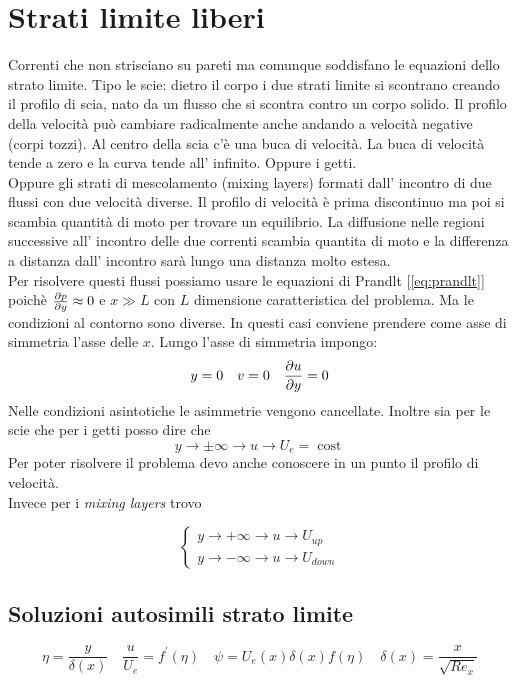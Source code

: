 \section{Strati limite liberi}
Correnti che non strisciano su pareti ma comunque soddisfano le equazioni dello strato limite. Tipo le scie: dietro il corpo i due strati limite si scontrano creando il profilo di scia, nato da un flusso che si scontra contro un corpo solido. Il profilo della velocità può cambiare radicalmente anche andando a velocità negative (corpi tozzi). Al centro della scia c'è una buca di velocità. La buca di velocità tende a zero e la curva tende all' infinito.
Oppure i getti.\\
Oppure gli strati di mescolamento (mixing layers) formati dall' incontro di due flussi con due velocità diverse. Il profilo di velocità è prima discontinuo ma poi si scambia quantità di moto per trovare un equilibrio. La diffusione nelle regioni successive all' incontro delle due correnti scambia quantita di moto e la differenza a distanza dall' incontro sarà lungo una distanza molto estesa.\\
Per risolvere questi flussi possiamo usare le equazioni di Prandlt [\cref{eq:prandlt}] poichè $ \frac{\partial p}{\partial y}\approx  0 $ e $ x\gg L $ con $ L  $ dimensione caratteristica del problema.   
Ma le condizioni al contorno sono diverse.
In questi casi conviene prendere come asse di simmetria l'asse delle $ x $.
Lungo l'asse di simmetria impongo: 
\[
  y = 0\quad v = 0 \quad \frac{\partial u}{\partial y}=0
\]
Nelle condizioni asintotiche le asimmetrie vengono cancellate.
Inoltre sia per le scie che per i getti posso dire che
\[
  y\to \pm \infty \rightarrow u \to U_e = \operatorname{cost} 
\]
Per poter risolvere il problema devo anche conoscere in un punto il profilo di velocità.\\
Invece per i \emph{mixing layers} trovo

\begin{equation*}
  \begin{cases}
    y \to +\infty\rightarrow u\to U_{up}\\
    y \to -\infty\rightarrow u\to U_{down}
  \end{cases}
\end{equation*}
\subsection{Soluzioni autosimili strato limite}

\[
  \eta =\frac{y}{\delta \left( x\right) }\quad \frac{u}{U_e}=f^{\prime}\left( \eta \right) \quad \psi = U_e\left( x\right) \delta \left( x\right) f\left( \eta \right)  \quad \delta \left( x\right) =\frac{x}{\sqrt{Re_x}}
\]

